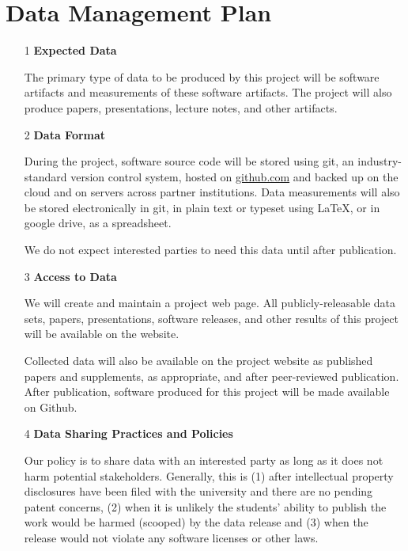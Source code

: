 


\section*{Data Management Plan}

\label{sec:datamgmt}

\begin{enumerate}
\item [1] {\bf Expected Data}

The primary type of data to be produced by this project will be
software artifacts and measurements of these software artifacts.
The project will also produce papers, presentations, lecture notes,
and other artifacts.
\item [2] {\bf Data Format}

During the project, software source code will be stored using git, an industry-standard
version control system, hosted on \url{github.com} and
backed up on the cloud and
on servers across partner institutions.
%
Data measurements
will also be stored electronically in git,
in plain text or typeset using LaTeX, or in google
drive, as a spreadsheet.

We do not expect interested parties to need this data until after publication.

\item [3] {\bf Access to Data}

We will create and maintain a project web page. %
All publicly-releasable data sets,
papers, presentations, software releases, and other results of this
project will be available on the website.

Collected data will also be available on the project website as published
papers and supplements, as appropriate, and after peer-reviewed
publication.
After publication, software produced for this project will be
made available on Github.


\item [4] {\bf Data Sharing Practices and Policies}

Our policy is to share data with an interested party as long as it does not
harm potential stakeholders.  Generally, this is (1) after intellectual property
disclosures have been filed with the university and there are no pending patent concerns,
(2) when it is unlikely the students' ability to publish the work would be harmed (scooped) by the data release
and (3) when the release would not violate any software licenses or other laws.


\end{enumerate}
